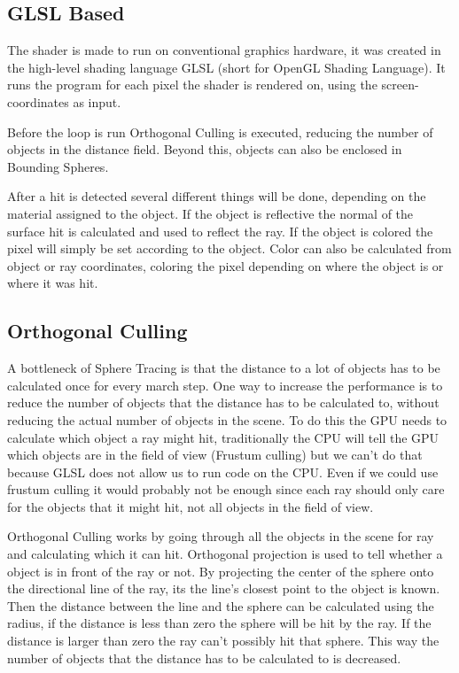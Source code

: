 		\subsection{GLSL Based}
	
			The shader is made to run on conventional graphics hardware, it was
			created in the high-level shading language GLSL (short for OpenGL
			Shading Language). It runs the program for each pixel the shader is
			rendered on, using the screen-coordinates as input.
			
			Before the loop is run Orthogonal Culling is executed, reducing the
			number of objects in the distance field. Beyond this, objects can
			also be enclosed in Bounding Spheres.
			
			After a hit is detected several different things will be done,
			depending on the material assigned to the object. If the object is
			reflective the normal of the surface hit is calculated and used to
			reflect the ray. If the object is colored the pixel will simply be
			set according to the object. Color can also be calculated from
			object or ray coordinates, coloring the pixel depending on where the
			object is or where it was hit.

		\subsection{Orthogonal Culling}

			A bottleneck of Sphere Tracing is that the distance to a lot of
			objects has to be calculated once for every march step. One way to
			increase the performance is to reduce the number of objects that
			the distance has to be calculated to, without reducing the actual
			number of objects in the scene. To do this the GPU needs to
			calculate which object a ray might hit, traditionally the CPU will
			tell the GPU which objects are in the field of view (Frustum
			culling) but we can't do that because GLSL does not allow us to run 
			code on the CPU. Even if we could use frustum culling it would
			probably not be enough since each ray should only care for the objects
			that it might hit, not all objects in the field of view.

			Orthogonal Culling works by going through all the objects in the 
			scene for ray and calculating which it can hit. Orthogonal 
			projection is used to tell whether a object is in front of the ray 
			or not. By projecting the center of the sphere onto the directional 
			line of the ray, its the line's closest point to the object is 
			known. Then the distance between the line and the sphere can be 
			calculated using the radius, if the distance is less than zero the 
			sphere will be hit by the ray. If the distance is larger than zero
			the ray can't possibly hit that sphere. This way the number of
			objects that the distance has to be calculated to is decreased.

